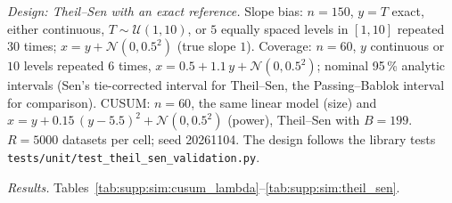 \textit{Design: Theil--Sen with an exact reference.} Slope bias: $n = 150$, $y = T$ exact, either continuous, $T \sim \mathcal{U}(1, 10)$, or $5$ equally spaced levels in $[1, 10]$ repeated $30$ times; $x = y + \mathcal{N}(0, 0.5^2)$ (true slope $1$). Coverage: $n = 60$, $y$ continuous or $10$ levels repeated $6$ times, $x = 0.5 + 1.1\,y + \mathcal{N}(0, 0.5^2)$; nominal 95\,\% analytic intervals (Sen's tie-corrected interval for Theil--Sen, the Passing--Bablok interval for comparison). CUSUM: $n = 60$, the same linear model (size) and $x = y + 0.15\,(y - 5.5)^2 + \mathcal{N}(0, 0.5^2)$ (power), Theil--Sen with $B = 199$. $R = 5000$ datasets per cell; seed 20261104. The design follows the library tests \texttt{tests/unit/test\_theil\_sen\_validation.py}.

\textit{Results.} Tables~\ref{tab:supp:sim:cusum_lambda}--\ref{tab:supp:sim:theil_sen}.

